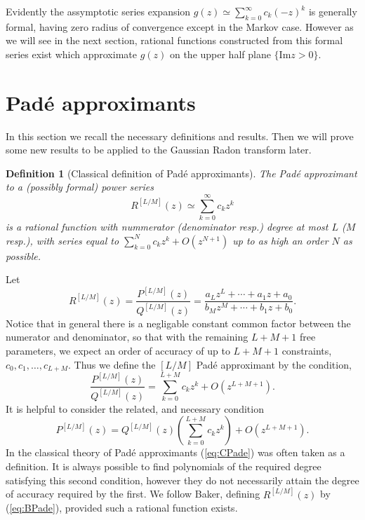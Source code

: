 \documentclass{amsart}
\newtheorem{definition}[theorem]{Definition}
\theoremstyle{remark}
\numberwithin{equation}{section}
\begin{document}
Evidently the assymptotic series expansion $g(z) \simeq \sum_{k=0}^\infty c_k (-z)^k$ is generally formal, having zero radius of convergence except in the Markov case. However as we will see in the next section, rational functions constructed from this formal series exist which approximate $g(z)$ on the upper half plane $\{\text{Im} z > 0\}$.

\section{Pad\'e approximants}

In this section we recall the necessary definitions and results. Then we will prove some new results to be applied to the Gaussian Radon transform later.

\begin{definition}[Classical definition of Pad\'e approximants]
The Pad\'e approximant to a (possibly formal) power series 
\[
    R^{[L/M]}(z) \simeq \sum_{k=0}^\infty c_k z^k
\]
is a rational function with nummerator (denominator resp.) degree at most $L$ ($M$ resp.), with series equal to $\sum_{k=0}^N c_k z^k + O(z^{N+1})$ up to as high an order $N$ as possible. 
\end{definition}
Let
\[
    R^{[L/M]}(z) = \frac{P^{[L/M]}(z)}{Q^{[L/M]}(z)} = \frac{a_Lz^L + \cdots + a_1z + a_0}{b_Mz^M + \cdots + b_1z + b_0}.
\]
Notice that in general there is a negligable constant common factor between the numerator and denominator, so that with the remaining $L+M+1$ free parameters, we expect an order of accuracy of up to $L+M+1$ constraints, $c_0, c_1, \ldots, c_{L+M}$. Thus we define the $[L/M]$ Pad\'e approximant by the condition,
\begin{equation}
    \label{eq:BPade}
    \frac{P^{[L/M]}(z)}{Q^{[L/M]}(z)} = \sum_{k=0}^{L+M} c_k z^k + O\left(z^{L+M+1}\right).
\end{equation}
It is helpful to consider the related, and necessary condition
\begin{equation}
    \label{eq:CPade}
    P^{[L/M]}(z) = Q^{[L/M]}(z)\left(\sum_{k=0}^{L+M} c_k z^k\right) + O\left(z^{L+M+1}\right).
\end{equation}
In the classical theory of Pad\'e approximants (\ref{eq:CPade}) was often taken as a definition. It is always possible to find polynomials of the required degree satisfying this second condition, however they do not necessarily attain the degree of accuracy required by the first. We follow Baker, defining $R^{[L/M]}(z)$ by (\ref{eq:BPade}), provided such a rational function exists.
\end{document}
